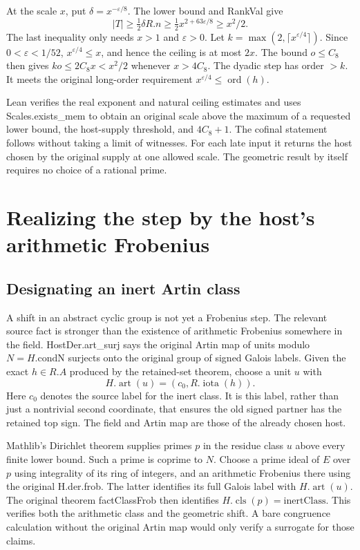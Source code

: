 \documentclass[12pt,letterpaper]{article}
\DeclareRobustCommand{\id}[1]{\mbox{\small\ttfamily #1}}
\begin{document}
At the scale \(x\), put \(\delta=x^{-\varepsilon/8}\). The lower bound and \id{RankVal} give
\begin{equation}
 |T|\ge\tfrac12\delta R.n\ge\tfrac12 x^{2+63\varepsilon/8}\ge x^2/2.
 \label{eq:host-density}
\end{equation}
The last inequality only needs \(x>1\) and \(\varepsilon>0\). Let \(k=\max(2,\lceil x^{\varepsilon/4}\rceil)\). Since \(0<\varepsilon<1/52\), \(x^{\varepsilon/4}\le x\), and hence the ceiling is at most \(2x\). The bound \(o\le C_8\) then gives \(ko\le 2 C_8 x <x^2/2\) whenever \(x>4 C_8\). The dyadic step has order \(>k\). It meets the original long-order requirement \(x^{\varepsilon/4}\le\operatorname{ord}(h)\).

Lean verifies the real exponent and natural ceiling estimates and uses \id{Scales.exists\_mem} to obtain an original scale above the maximum of a requested lower bound, the host-supply threshold, and \(4C_8+1\). The cofinal statement follows without taking a limit of witnesses. For each late input it returns the host chosen by the original supply at one allowed scale. The geometric result by itself requires no choice of a rational prime.

\section{Realizing the step by the host's arithmetic Frobenius}
\label{sec:artin}

\subsection{Designating an inert Artin class}

A shift in an abstract cyclic group is not yet a Frobenius step. The relevant source fact is stronger than the existence of arithmetic Frobenius somewhere in the field. \id{HostDer.art\_surj} says the original Artin map of units modulo \(N=H.\mathrm{condN}\) surjects onto the original group of signed Galois labels. Given the exact \(h\in R.A\) produced by the retained-set theorem, choose a unit \(u\) with
\[
                         H.\operatorname{art}(u)=(c_0,R.\operatorname{iota}(h)).
 \label{eq:artin-class}
\]
Here \(c_0\) denotes the source label for the inert class. It is this label, rather than just a nontrivial second coordinate, that ensures the old signed partner has the retained top sign. The field and Artin map are those of the already chosen host.

Mathlib's Dirichlet theorem supplies primes \(p\) in the residue class \(u\) above every finite lower bound. Such a prime is coprime to \(N\). Choose a prime ideal of \(E\) over \(p\) using integrality of its ring of integers, and an arithmetic Frobenius there using the original \id{H.der.frob}. The latter identifies its full Galois label with \(H.\operatorname{art}(u)\). The original theorem \id{factClassFrob} then identifies \(H.\operatorname{cls}(p)=\mathrm{inertClass}\). This verifies both the arithmetic class and the geometric shift. A bare congruence calculation without the original Artin map would only verify a surrogate for those claims.
\end{document}
